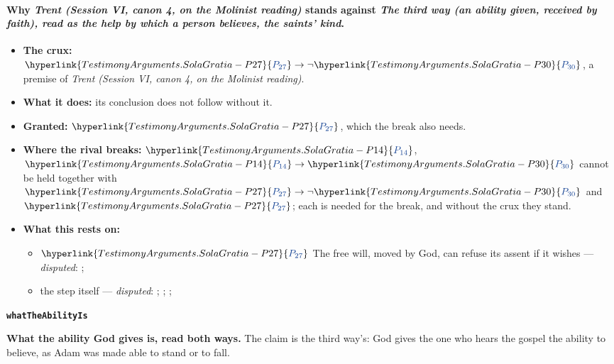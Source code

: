\documentclass[11pt]{article}
\newcommand{\pvar}[2]{\hyperlink{#1-P#2}{\textcolor{claimlink}{P_{#2}}}}
\begin{document}
\paragraph{Why \emph{Trent (Session VI, canon 4, on the Molinist reading)} stands against \emph{The third way (an ability given, received by faith), read as the help by which a person believes, the saints’ kind}.}
\begin{itemize}
\item \textbf{The crux:} \(\pvar{TestimonyArguments.SolaGratia}{27} \rightarrow \lnot \pvar{TestimonyArguments.SolaGratia}{30}\), a premise of \emph{Trent (Session VI, canon 4, on the Molinist reading)}.
\item \textbf{What it does:} its conclusion does not follow without it.
\item \textbf{Granted:} \(\pvar{TestimonyArguments.SolaGratia}{27}\), which the break also needs.
\item \textbf{Where the rival breaks:} \(\pvar{TestimonyArguments.SolaGratia}{14}\), \(\pvar{TestimonyArguments.SolaGratia}{14} \rightarrow \pvar{TestimonyArguments.SolaGratia}{30}\) cannot be held together with \(\pvar{TestimonyArguments.SolaGratia}{27} \rightarrow \lnot \pvar{TestimonyArguments.SolaGratia}{30}\) and \(\pvar{TestimonyArguments.SolaGratia}{27}\); each is needed for the break, and without the crux they stand.
\item \textbf{What this rests on:}
\begin{itemize}
\item \(\pvar{TestimonyArguments.SolaGratia}{27}\) The free will, moved by God, can refuse its assent if it wishes --- \emph{disputed}: \cite[Trent, Session VI (1547), canon 4]{tanner-decrees-1990}; \cite[45]{waterworth-trent-1848}
\item the step itself --- \emph{disputed}: \cite[I-II q.10 a.4 ad 3]{aquinas-summa-1920}; \cite[I-II q.112 a.3]{aquinas-summa-1920}; \cite[Trent, Session VI (1547), canon 4]{tanner-decrees-1990}; \cite[45]{waterworth-trent-1848}
\end{itemize}
\end{itemize}
\par\medskip\noindent\textbf{\texttt{what\allowbreak{}The\allowbreak{}Ability\allowbreak{}Is}}\par\nobreak\noindent
\textbf{What the ability God gives is, read both ways.} The claim is the third way’s: God gives the one who hears the gospel the ability to believe, as Adam was made able to stand or to fall.
\end{document}
